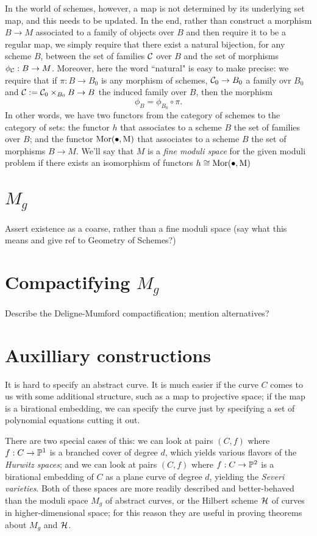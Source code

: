 In the world of schemes, however, a map is not determined by its underlying set map, and this needs to be updated. In the end, rather than construct a morphism $B \to M$ associated to a family of objects over $B$ and then require it to be a regular map, we simply require that there exist a natural bijection, for any scheme $B$, between the set of families $\cC$ over $B$ and the set of morphisms $\phi_\cC : B \to M$. Moreover, here the word ``natural" is easy to make precise: we require that if $\pi : B \to B_0$ is any morphism of schemes, $\cC_0 \to B_0$ a family ovr $B_0$ and $\cC := \cC_0 \times_{B_0} B \to B$ the induced family over $B$, then the morphism
$$
\phi_B = \phi_{B_0} \circ \pi.
$$
In other words, we have two functors from the category of schemes to the category of sets: the functor $h$ that associates to a scheme $B$ the set of families over $B$; and the functor $\rm{Mor}(\bullet, M)$ that associates to a scheme $B$ the set of morphisms $B \to M$. We'll say that $M$ is a \emph{fine moduli space} for the given moduli problem if there exists an isomorphism of functors $h \cong \rm{Mor}(\bullet, M)$

\section{$M_g$}

Assert existence as a coarse, rather than a fine moduli space (say what this means and give ref to Geometry of Schemes?)

\section{Compactifying $M_g$}

Describe the Deligne-Mumford compactification; mention alternatives?

\section{Auxilliary constructions}

It is hard to specify an abstract curve. It is much easier if the curve $C$ comes to us with some additional structure, such as a map to projective space; if the map is a birational embedding, we can specify the curve just by specifying a set of polynomial equations cutting it out. 

There are two special cases of this: we can look at pairs $(C,f)$ where $f : C \to \PP^1$ is a branched cover of degree $d$, which yields various flavors of the \emph{Hurwitz spaces}; and we can look at pairs $(C,f)$ where $f : C \to \PP^2$ is a birational embedding of $C$ as a plane curve of degree $d$, yielding the \emph{Severi varieties}. Both of these spaces are more readily described and better-behaved than the moduli space $M_g$ of abstract curves, or the Hilbert scheme $\cH$ of curves in higher-dimensional space; for this reason they are useful in proving theorems about $M_g$ and $\cH$.

